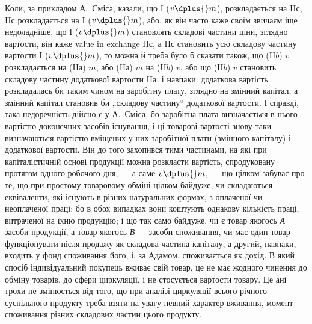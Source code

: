 Коли, за прикладом А.~Сміса, казали, що I ($v \dplus{} m$), розкладається на
II$с$, II$с$ розкладається на I ($v \dplus{} m$), або, як він часто каже своїм
звичаєм іще недоладніше, що I ($v \dplus{} m$) становлять складові частини ціни,
зглядно вартости, він каже value in exchange II$с$, а II$с$ становить усю
складову частину вартости I ($v \dplus{} m$), то можна й треба було б сказати
також, що (II$b$) $v$ розкладається на (II$а$) $m$, або (II$а$) $m$ на (II$b$) $v$,
або що (II$b$) $v$ становить складову частину додаткової вартости II$а$, і
навпаки: додаткова вартість розкладалась би таким чином на заробітну
плату, зглядно на змінний капітал, а змінний капітал становив би „складову
частину“ додаткової вартости. І справді, така недоречність дійсно
є у А.~Сміса, бо заробітна плата визначається в нього вартістю доконечних
засобів існування, і ці товарові вартості знову таки визначаються
вартістю вміщених у них заробітної плати (змінного капіталу) і додаткової
вартости. Він до того захопився тими частинами, на які при капіталістичній
основі продукції можна розкласти вартість, спродуковану протягом
одного робочого дня, — а саме $v \dplus{} m$, — що цілком забуває про те, що при
простому товаровому обміні цілком байдуже, чи складаються еквіваленти,
які існують в різних натуральних формах, з оплаченої чи неоплаченої праці:
бо в обох випадках вони коштують однакову кількість праці, витраченої
на їхню продукцію; і що так само байдуже, чи є товар якогось \emph{А} засоби
продукції, а товар якогось \emph{В} — засоби споживання, чи має один
товар функціонувати після продажу як складова частина капіталу, а
другий, навпаки, входить у фонд споживання його, і, за Адамом, споживається
як дохід. В який спосіб індивідуальний покупець вживає свій
товар, це не має жодного чинення до обміну товарів, до сфери циркуляції,
і не стосується вартости товару. Це ані трохи не змінюється
від того, що при аналізі циркуляції всього річного суспільного продукту
треба взяти на увагу певний характер вживання, момент споживання
різних складових частин цього продукту.

